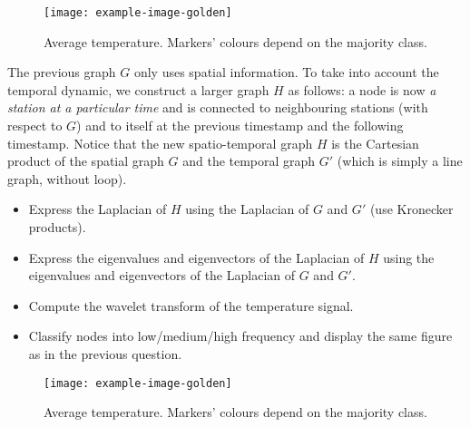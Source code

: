 \documentclass[11pt]{article}
\begin{document}
\begin{solution}
\begin{figure}
    \centering
    \begin{minipage}[t]{0.8\textwidth}
    \centerline{\texttt{[image: example-image-golden]}}
    \end{minipage}
    \caption{Average temperature. Markers' colours depend on the majority class.}
\end{figure}
\end{solution}

\newpage
\begin{exercise}
The previous graph $G$ only uses spatial information.
To take into account the temporal dynamic, we construct a larger graph $H$ as follows: a node is now \textit{a station at a particular time} and is connected to neighbouring stations (with respect to $G$) and to itself at the previous timestamp and the following timestamp.
Notice that the new spatio-temporal graph $H$ is the Cartesian product of the spatial graph $G$ and the temporal graph $G'$ (which is simply a line graph, without loop).

\begin{itemize}
    \item Express the Laplacian of $H$ using the Laplacian of $G$ and $G'$ (use Kronecker products).
    \item Express the eigenvalues and eigenvectors of the Laplacian of $H$ using the eigenvalues and eigenvectors of the Laplacian of $G$ and $G'$.
    \item Compute the wavelet transform of the temperature signal.
    \item Classify nodes into low/medium/high frequency and display the same figure as in the previous question.
\end{itemize}
\end{exercise}

\begin{solution}
\begin{figure}
    \centering
    \begin{minipage}[t]{0.8\textwidth}
    \centerline{\texttt{[image: example-image-golden]}}
    \end{minipage}
    \caption{Average temperature. Markers' colours depend on the majority class.}
\end{figure}
\end{solution}
\end{document}
